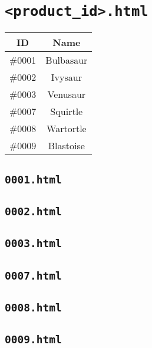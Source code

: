 \section{\texttt{<product\_id>.html}} 
\begin{tabular}{|c|c|}
    \hline
    \textbf{ID} & \textbf{Name}\\
    \hline
    \#0001 & Bulbasaur\\
    \hline
    \#0002 & Ivysaur\\
    \hline
    \#0003 & Venusaur\\
    \hline
    \#0007 & Squirtle\\
    \hline
    \#0008 & Wartortle\\
    \hline
    \#0009 & Blastoise\\
    \hline
\end{tabular}

\subsection{\texttt{0001.html}}

\newpage
\subsection{\texttt{0002.html}}

\newpage
\subsection{\texttt{0003.html}}

\newpage
\subsection{\texttt{0007.html}}

\newpage
\subsection{\texttt{0008.html}}

\newpage
\subsection{\texttt{0009.html}}
